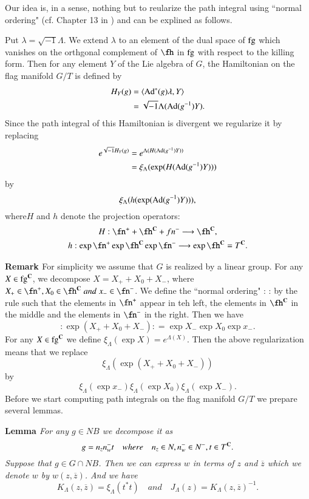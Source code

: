 Our idea is, in a sense, nothing but to reularize the path integral using ``normal ordering" (cf. Chapter 13 in \cite{chap15-key10}) and can be explined as follows.

Put $\lambda = \sqrt{-1}\Lambda$. We extend $\lambda$ to an element of the dual space of $\operatorname{fg}$ which vanishes on the orthgonal complement of $\fh$ in $\operatorname{fg}$ with respect to the killing form. Then for any element $Y$ of the Lie algebra of $G$, the Hamiltonian on the flag manifold $G/T$ is defined by
\begin{align*}
H_{Y}(g)&=\langle \operatorname{Ad}^{*}(g)\lambda, Y\rangle\\
&= \sqrt{-1}\Lambda(\operatorname{Ad}(g^{-1})Y).
\end{align*}
Since the path integral of this Hamiltonian is divergent we regularize it by replacing
\begin{align*}
e^{\sqrt{-1}H_{Y}(g)}&= e^{\Lambda(H(\operatorname{Ad}(g^{-1})Y))}\\
& = \xi_{\Lambda}(\exp(H(\operatorname{Ad}(g^{-1})Y)))
\end{align*}
by
$$
\xi_{\Lambda}(h(\exp(\operatorname{Ad}(g^{-1})Y))),
$$
where$H$ and $h$ denote the projection operators:
\begin{gather*}
H : \fn^{+} + \fh^{\bC}+ fn^{-}\longrightarrow \fh^{\bC},\\
h : \exp \fn^{+} \exp \fh^{\bC} \exp \fn^{-} \longrightarrow \exp \fh^{\bC} =T^{\bC}.
\end{gather*}

\medskip
\noindent
{\bfseries Remark  \label{chap15-remark-1}} For simplicity we assume that $G$ is realized by a linear group. For any $X\in \operatorname{fg}^{\mathbf{C}}$, we decompose $X=X_{+}+X_{0}+X_{-}$, where $X_{+}\in \fn^{+}, X_{0} \in \fh^{\bC} \;and \; x_{-} \in \fn^{-}$. We define the ``normal ordering" : : by the rule such that the elements in $\fn^{+}$ appear in teh left, the elements in $\fh^{\bC}$ in the middle and the elements in $\fn^{-}$ in the right. Then we have
$$
: \exp (X_{+} + X_{0} + X_{-}): =\exp X_{-}\exp X_{0} \exp x_{-}.
$$ 
For any $X \in \operatorname{fg}^{\mathbf{C}}$ we define $\xi_{\Lambda}(\exp X) = e^{\Lambda(X)}$. Then the above regularization means that we replace
$$
\xi_{\Lambda}(\exp(X_{+}+ X_{0}+ X_{-}))
$$
by\pageoriginale
$$
\xi_{\Lambda}(\exp x_{-})\xi_{\Lambda}(\exp X_{0})\xi_{\Lambda}(\exp X_{-}).
$$
Before we start computing path integrals on the flag manifold $G/T$ we prepare several lemmas.

\medskip
\noindent
{\bfseries Lemma  \label{chap15-lemma-2}} \textit{For any $g \in N B$ we decompose it as}
$$
g =n_{z}n_{w}^{-}t \quad where \quad n_{z} \in N, n_{w}^{-} \in N^{-}, t \in T^{\mathbf{C}}.
$$
\textit{Suppose that $g \in G \cap N B$. Then we can express $w$ in terms of $z$ and $\overline{z}$ which we denote $w$ by $w(z,\overline{z})$. And we have}
$$
K_{\Lambda}(z, \overline{z})= \xi_{\Lambda}(t^{*}t) \quad and \quad J_{\Lambda}(z)=K_{\Lambda}(z, \overline{z})^{-1}.
$$

